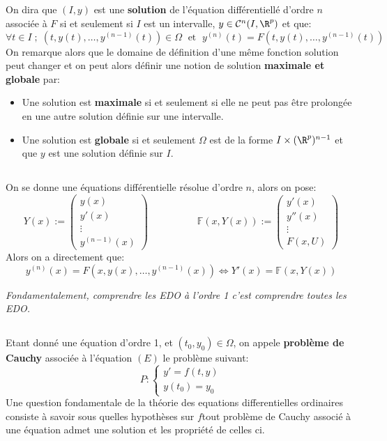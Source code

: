 \subsection*{}
On dira que \((I, y)\) est une \textbf{solution} de l'équation différentiellé d'ordre \( n \) associée à \( F \) si et seulement si \( I \) est un intervalle, \(y \in \mathcal{C}^n(I, \R^p)\) et que:
\[ 
   \forall t \in I \; ; \; (t, y(t), \ldots, y^{(n-1)}(t)) \in \Omega \; \text{ et } \; y^{(n)}(t) = F(t, y(t), \ldots, y^{(n-1)}(t))
\]
On remarque alors que le domaine de définition d'une même fonction solution peut changer et on peut alors définir une notion de solution \textbf{maximale et globale} par:
\begin{itemize}
   \item Une solution est \textbf{maximale} si et seulement si elle ne peut pas être prolongée en une autre solution définie sur une intervalle.
   \item Une solution est \textbf{globale} si et seulement \( \Omega \) est de la forme \(I \times (\R^p)^{n-1}\) et que \( y \) est une solution définie sur \( I \).
\end{itemize}
\subsection*{}
On se donne une équations différentielle résolue d'ordre \(n\), alors on pose:
\[
   Y(x) := \begin{pmatrix}
      y(x)\\
      y'(x)\\
      \vdots\\
      y^{(n-1)}(x)
   \end{pmatrix} \quad \quad \quad \quad\quad
   \mathbb{F}(x, Y(x)) := \begin{pmatrix}
      y'(x)\\
      y''(x)\\
      \vdots\\
      F(x, U)
   \end{pmatrix}
\]
Alors on a directement que:
\[
   y^{(n)}(x) = F(x, y(x), \ldots, y^{(n-1)}(x)) \Longleftrightarrow Y'(x) = \mathbb{F}(x, Y(x))
\]
\begin{center}
   \textit{Fondamentalement, comprendre les EDO à l'ordre 1 c'est comprendre toutes les EDO.}
\end{center}
\subsection*{}
Etant donné une équation d'ordre 1, et \( (t_0, y_0) \in \Omega \), on appele \textbf{problème de Cauchy} associée à l'équation \( (E) \) le problème suivant:
\[ 
   P: \begin{cases}
      y' = f(t, y)\\
      y(t_0) = y_0
   \end{cases} 
\]
Une question fondamentale de la théorie des equations differentielles ordinaires consiste à savoir sous quelles hypothèses sur \(  f \)tout problème de Cauchy associé à une équation admet une solution et les propriété de celles ci.
